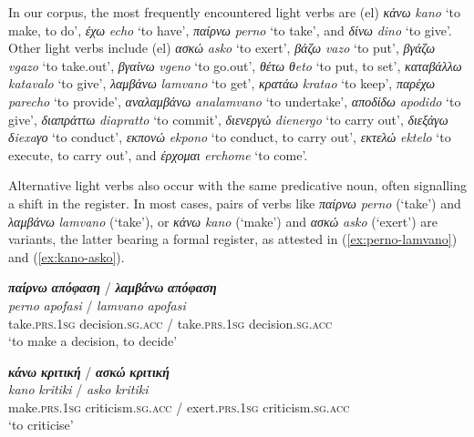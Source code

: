\documentclass[output=paper,colorlinks,citecolor=brown]{langscibook}
\begin{document}
In our corpus, the most frequently encountered light verbs are (el) \textit{κάνω} \textit{kano} `to make, to do', \textit{έχω} \textit{echo} `to have', \textit{παίρνω} \textit{perno} `to take', and \textit{δίνω} \textit{dino} `to give'. Other light verbs include (el) \textit{ασκώ} \textit{asko} `to exert', \textit{βάζω} \textit{vazo} `to put', \textit{βγάζω} \textit{vgazo} `to take.out', \textit{βγαίνω} \textit{vgeno} `to go.out', \textit{θέτω} \textit{θeto} `to put, to set', \textit{καταβάλλω} \textit{katavalo} `to give', \textit{λαμβάνω} \textit{lamvano} `to get', \textit{κρατάω} \textit{kratao} `to keep', \textit{παρέχω} \textit{parecho} `to provide', \textit{αναλαμβάνω} \textit{analamvano} `to undertake', \textit{αποδίδω} \textit{apodido} `to give', \textit{διαπράττω} \textit{diapratto} `to commit', \textit{διενεργώ} \textit{dienergo} `to carry out', \textit{διεξάγω} \textit{δiexaγο} `to conduct', \textit{εκπονώ} \textit{ekpono} `to conduct, to carry out', \textit{εκτελώ} \textit{ektelo} `to execute, to carry out', and \textit{έρχομαι} \textit{erchome} `to come'.


Alternative light verbs also occur with the same predicative noun, often signalling a shift in the register. In most cases, pairs of verbs like \textit{παίρνω} \textit{perno} (`take') and \textit{λαμβάνω} \textit{lamvano} (`take'), or \textit{κάνω} \textit{kano} (`make') and \textit{ασκώ} \textit{asko} (`exert') are variants, the latter bearing a formal register, as attested in (\ref{ex:perno-lamvano}) and (\ref{ex:kano-asko}). 

\ea
 \label{ex:perno-lamvano}
 \settowidth {}
 \glll
 \textbf{\em{παίρνω}} \textbf{\em{απόφαση}} / \textbf{\em{λαμβάνω}} \textbf{\em{απόφαση}}\\ 
\textit{perno} \textit{apofasi} / \textit{lamvano} \textit{apofasi} \\
take.\textsc{prs.1sg} decision.\textsc{sg.acc} / take.\textsc{prs.1sg} decision.\textsc{sg.acc} \\
\glt `to make a decision, to decide' \\
\z

\ea
 \label{ex:kano-asko}
 \settowidth {}
 \glll
 \textbf{\em{κάνω}} \textbf{\em{κριτική}} / \textbf{\em{ασκώ}} \textbf{\em{κριτική}}\\ 
\textit{kano} \textit{kritiki} / \textit{asko} \textit{kritiki} \\
make.\textsc{prs.1sg} criticism.\textsc{sg.acc} / exert.\textsc{prs.1sg} criticism.\textsc{sg.acc} \\
\glt `to criticise' \\
\z
\end{document}
